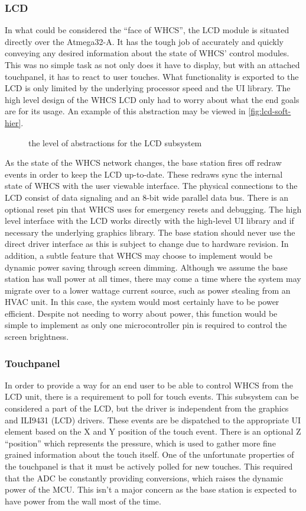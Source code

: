 \documentclass[draft,twocolumn,letterpaper,10pt]{IEEEtran}
\newcommand{\ucffig}[3]{
\begin{figure}[h]
\centering
\makebox[\linewidth][c]{
#2
}
\caption{#3}
\label{#1}
\end{figure}
}
\newcommand{\ucfgfx}[4][scale=1.0]{
\ucffig{#2}{\texttt{[image: \#3]}}{#4}
}
\begin{document}
\subsubsection{LCD}
In what could be considered the ``face of WHCS'', the LCD module is
situated directly over the Atmega32-A. It has the tough job of accurately
and quickly conveying any desired information about the state of WHCS' control
modules. This was no simple task as not only does it have to display, but with
an attached touchpanel, it has to react to user touches. What functionality is
exported to the LCD is only limited by the underlying processor speed and the
UI library. The high level design of the WHCS LCD only had to worry about
what the end goals are for its usage. An example of this abstraction may be
viewed in \autoref{fig:lcd-soft-hier}.

\ucfgfx[width=\linewidth]{fig:lcd-soft-hier}{lcd-soft-hier}{the level of abstractions for the LCD
subsystem}

As the state of the WHCS network changes, the base station fires
off redraw events in order to keep the LCD up-to-date. These redraws sync
the internal state of WHCS with the user viewable interface. The physical
connections to the LCD consist of data signaling and an 8-bit wide
parallel data bus. There is an optional reset pin that WHCS uses for
emergency resets and debugging. The high level interface with the LCD works
directly with the high-level UI library and if necessary the underlying
graphics library. The base station should never use the direct driver interface
as this is subject to change due to hardware revision. 
In addition, a subtle feature that WHCS may choose to implement would be
dynamic power saving through screen dimming. Although we assume the base
station has wall power at all times, there may come a time where the
system may migrate over to a lower wattage current source, such as power
stealing from an HVAC unit. In this case, the system would most certainly have
to be power efficient. Despite not needing to worry about power, this function
would be simple to implement as only one microcontroller pin is required to
control the screen brightness.

\subsubsection{Touchpanel}
In order to provide a way for an end user to be able to control WHCS from the
LCD unit, there is a requirement to poll for touch events.
This subsystem can be considered a part of the LCD, but the driver is independent
from the graphics and ILI9431 (LCD) drivers. These events are be dispatched
to the appropriate UI element  based on the X and Y position of the touch
event. There is an optional Z ``position'' which represents the pressure,
which is used to gather more fine grained information
about the touch itself. One of the unfortunate properties of the touchpanel is
that it must be actively polled for new touches. This required that the ADC be
constantly providing conversions, which raises the dynamic power of the MCU.
This isn't a major concern as the base station is expected to have power from the wall
most of the time.
\end{document}
